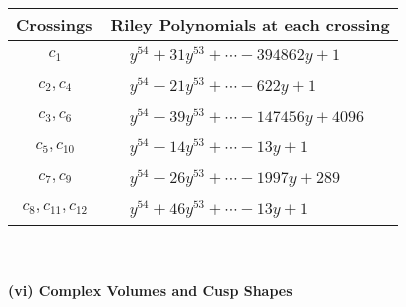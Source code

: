 \documentclass[1p]{elsarticle_modified}
\theoremstyle{definition}
\begin{document}
\begin{tabular}{m{50pt}|m{274pt}}
Crossings & \hspace{64pt}Riley Polynomials at each crossing \\
\hline $$\begin{aligned}c_{1}\end{aligned}$$&$\begin{aligned}
&y^{54}+31 y^{53}+\cdots-394862 y+1
\end{aligned}$\\
\hline $$\begin{aligned}c_{2},c_{4}\end{aligned}$$&$\begin{aligned}
&y^{54}-21 y^{53}+\cdots-622 y+1
\end{aligned}$\\
\hline $$\begin{aligned}c_{3},c_{6}\end{aligned}$$&$\begin{aligned}
&y^{54}-39 y^{53}+\cdots-147456 y+4096
\end{aligned}$\\
\hline $$\begin{aligned}c_{5},c_{10}\end{aligned}$$&$\begin{aligned}
&y^{54}-14 y^{53}+\cdots-13 y+1
\end{aligned}$\\
\hline $$\begin{aligned}c_{7},c_{9}\end{aligned}$$&$\begin{aligned}
&y^{54}-26 y^{53}+\cdots-1997 y+289
\end{aligned}$\\
\hline $$\begin{aligned}c_{8},c_{11},c_{12}\end{aligned}$$&$\begin{aligned}
&y^{54}+46 y^{53}+\cdots-13 y+1
\end{aligned}$\\
\hline
\end{tabular}\\~\\
\newpage\flushleft \textbf{(vi) Complex Volumes and Cusp Shapes}
\end{document}

